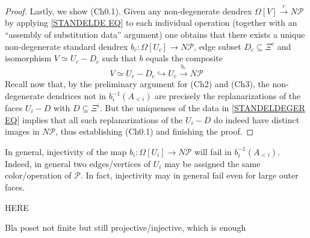 \documentclass[a4paper,10pt
,draft
]{article}%
\renewcommand{\1}{\ensuremath{\mathbb{id}}}
\begin{document}
\begin{proof}
Lastly, we show (Ch0.1).
Given any non-degenerate dendrex
$\Omega[V] \xrightarrow{c} N \mathcal{P}$
by applying \eqref{STANDELDE EQ} to each individual operation
(together with an ``assembly of substitution data'' argument)
one obtains that there exists a unique
non-degenerate standard dendrex 
$b_c \colon \Omega[U_c] \to N \mathcal{P}$,
edge subset $D_c \subseteq \Xi^c$ and isomorphism
$V \simeq U_c - D_c$
such that $b$ equals the composite
\begin{equation}\label{STANDELDEGER EQ}
	V \simeq U_c - D_c
	\hookrightarrow U_c
	\xrightarrow{b_c} N \mathcal{P}
\end{equation}
Recall now that, by the preliminary argument for (Ch2) and (Ch3), 
the non-degenerate dendrices not in 
$b_i^{-1}(A_{< i})$ are precisely the replanarizations of the faces 
$U_i - D$ with $D \subseteq \Xi^i$.
But the uniqueness of the data in \eqref{STANDELDEGER EQ}
implies that all such replanarizations of the $U_i - D$
do indeed have distinct images in $N \mathcal{P}$,
thus establishing (Ch0.1) and finishing the proof.
\end{proof}


\begin{remark}
	In general, injectivity of the map
	$b_i \colon \Omega[U_i] \to N \mathcal{P}$
	will fail in $b_i^{-1}(A_{< i})$.
	Indeed, in general two edges/vertices of $U_i$
	may be assigned the same color/operation of $\mathcal{P}$.
	In fact, injectivity may in general fail even for large outer faces.
\end{remark}

{\color{red} HERE}

{\color{blue} Bla poset not finite but still projective/injective, which is enough}



{}




\end{document}
